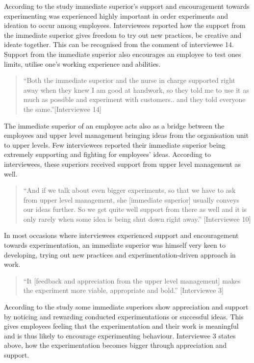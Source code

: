 According to the study immediate superior's support and encouragement towards experimenting was experienced highly important in order experiments and ideation to occur among employees. Interviewees reported how the support from the immediate superior gives freedom to try out new practices, be creative and ideate together. This can be recognised from the comment of interviewee 14. Support from the immediate superior also encourages an employee to test ones limits, utilise one's working experience and abilities. 
\begin{quote}
 ``Both the immediate superior and the nurse in charge supported right away when they knew I am good at handwork, so they told me to use it as much as possible and experiment with customers.. and they told everyone the same.''[Interviewee 14]
\end{quote}
The immediate superior of an employee acts also as a bridge between the employees and upper level management bringing ideas from the organisation unit to upper levels. Few interviewees reported their immediate superior being extremely supporting and fighting for employees' ideas. According to interviewees, these superiors received support from upper level management as well. 
\begin{quote}
 ``And if we talk about even bigger experiments, so that we have to ask from upper level management, she [immediate superior] usually conveys our ideas further. So we get quite well support from there as well and it is only rarely when some idea is being shut down right away.'' [Interviewee 10]
\end{quote}
In most occasions where interviewees experienced support and encouragement towards experimentation, an immediate superior was himself very keen to developing, trying out new practices and experimentation-driven approach in work.   
\begin{quote}
``It [feedback and appreciation from the upper level management] makes the experiment more viable, appropriate and bold.'' [Interviewee 3]
\end{quote}
According to the study some immediate superiors show appreciation and support by noticing and rewarding conducted experimentations or successful ideas. This gives employees feeling that the experimentation and their work is meaningful and is thus likely to encourage experimenting behaviour. Interviewee 3 states above, how the experimentation becomes bigger through appreciation and support. 

